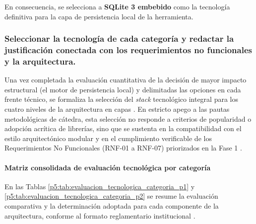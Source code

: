 En consecuencia, se selecciona a \textbf{SQLite 3 embebido} como la tecnología definitiva para la capa de persistencia local de la herramienta.

\subsubsection{Seleccionar la tecnología de cada categoría y redactar la justificación conectada con los requerimientos no funcionales y la arquitectura.}
Una vez completada la evaluación cuantitativa de la decisión de mayor impacto estructural (el motor de persistencia local) y delimitadas las opciones en cada frente técnico, se formaliza la selección del \textit{stack} tecnológico integral para los cuatro niveles de la arquitectura en capas \cite{pressman2020software, martin2017cleanarch}. En estricto apego a las pautas metodológicas de cátedra, esta selección no responde a criterios de popularidad o adopción acrítica de librerías, sino que se sustenta en la compatibilidad con el estilo arquitectónico modular y en el cumplimiento verificable de los Requerimientos No Funcionales (RNF-01 a RNF-07) priorizados en la Fase 1 \cite{iso2011sqa, torres2026proyecto}.

\paragraph*{Matriz consolidada de evaluación tecnológica por categoría}
En las Tablas \ref{p5:tab:evaluacion_tecnologica_categoria_p1} y \ref{p5:tab:evaluacion_tecnologica_categoria_p2} se resume la evaluación comparativa y la determinación adoptada para cada componente de la arquitectura, conforme al formato reglamentario institucional \cite{torres2026proyecto}.

